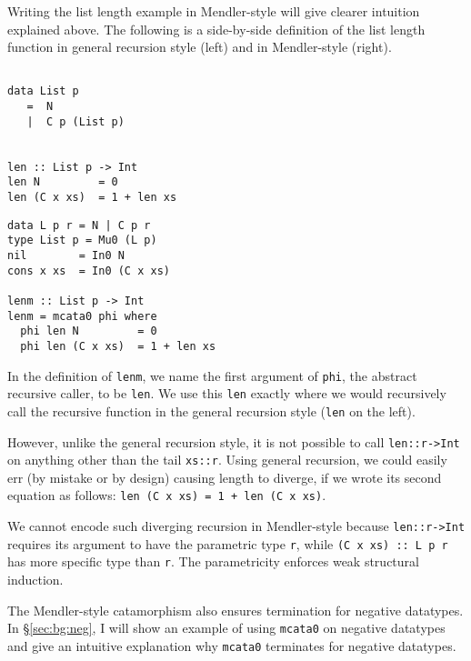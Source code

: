 \documentclass[letterpaper,12pt]{article}
\begin{document}
Writing the list length example in Mendler-style will give clearer
intuition explained above. The following is a side-by-side definition of
the list length function in general recursion style (left)
and in Mendler-style (right).
\begin{center}
\begin{minipage}{.49\linewidth}
\begin{verbatim}
 
data List p
   =  N
   |  C p (List p)


len :: List p -> Int
len N         = 0
len (C x xs)  = 1 + len xs
\end{verbatim}
\end{minipage}
\begin{minipage}{.49\linewidth}
\begin{verbatim}
data L p r = N | C p r
type List p = Mu0 (L p)
nil        = In0 N
cons x xs  = In0 (C x xs)

lenm :: List p -> Int
lenm = mcata0 phi where
  phi len N         = 0
  phi len (C x xs)  = 1 + len xs
\end{verbatim}
\end{minipage}
\end{center}
In the definition of \verb|lenm|,
we name the first argument of \verb|phi|, the abstract recursive caller,
to be \verb|len|.  We use this \verb|len| exactly where we would recursively
call the recursive function in the general recursion style
(\verb|len| on the left).

However, unlike the general recursion style, it is not possible to call
\verb|len::r->Int| on anything other than the tail \verb|xs::r|.
Using general recursion, we could easily err (by mistake or by design)
causing length to diverge, if we wrote its second equation as follows:
\verb|len (C x xs) = 1 + len (C x xs)|.

We cannot encode such diverging recursion in Mendler-style because
\verb|len::r->Int| requires its argument to have the parametric type \verb|r|,
while \verb|(C x xs) :: L p r| has more specific type than \verb|r|.
The parametricity enforces weak structural induction.


The Mendler-style catamorphism also ensures termination for negative datatypes.
In \S\ref{sec:bg:neg}, I will show an example of using \verb|mcata0| on negative
datatypes and give an intuitive explanation why \verb|mcata0|
terminates for negative datatypes.
\end{document}
